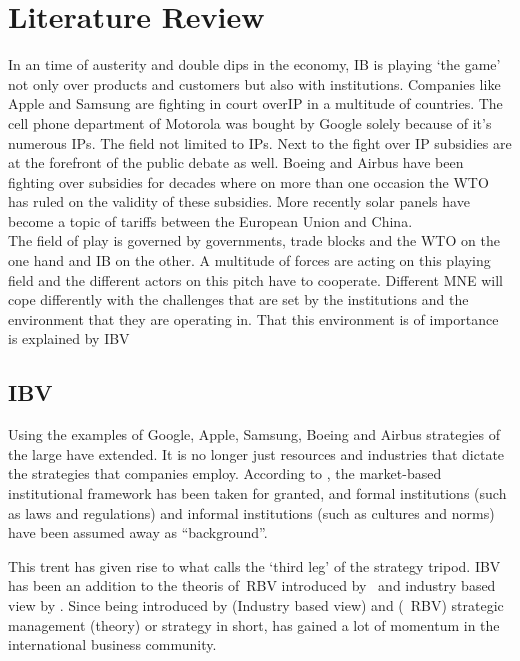 \chapter{Literature Review}



In an time of austerity and double dips in the economy, \gls{IB} is playing `the game' not only over products and customers but also with institutions. Companies like Apple and Samsung are  fighting in court over\gls{IP} in a multitude of countries. The cell phone department of Motorola was bought by Google solely because of it's numerous \glspl{IP}. The field not limited to \glspl{IP}. Next to the fight over \gls{IP} subsidies are at the forefront of the public debate as well. Boeing and Airbus have been fighting over subsidies for decades where on more than one occasion the \gls{WTO} has ruled on the validity of these subsidies. More recently solar panels have become a topic of tariffs between the European Union and China. \\

The field of play is governed by governments, trade blocks and the \gls{WTO} on the one hand and \gls{IB} on the other.
A multitude of forces are acting on this playing field and the different actors on this pitch have to cooperate. 
Different \gls{MNE} will cope differently with the challenges that are set by the institutions and the environment that they are operating in. That this environment is of importance is explained by \gls{IBV}~\cite{Kostova:1999,Meyer:2009,Wang:2012} 

\section{\glsdesc{IBV}}

Using the examples of Google, Apple, Samsung, Boeing and Airbus strategies of the large \mne have extended. It is no longer just resources and industries that dictate the strategies that companies employ. According to \cite{Peng:2009}, the market-based institutional framework has been taken for granted, and formal institutions (such as laws and regulations) and informal institutions (such as cultures and norms) have been assumed away as ``background''.

This trent has given rise to what \cite{Peng:2009} calls the `third leg' of the strategy tripod. \Gls{IBV} has been an addition to the theoris of~\gls{RBV} introduced by~\cite{Barney:1991} and industry based view by \cite{Porter:1980}. 
Since being introduced by \cite{Porter:1980} (Industry based view) and \cite{Barney:1991}(~\gls{RBV}) strategic management (theory) or strategy in short, has gained a lot of momentum in the international business community. 
\\ 

